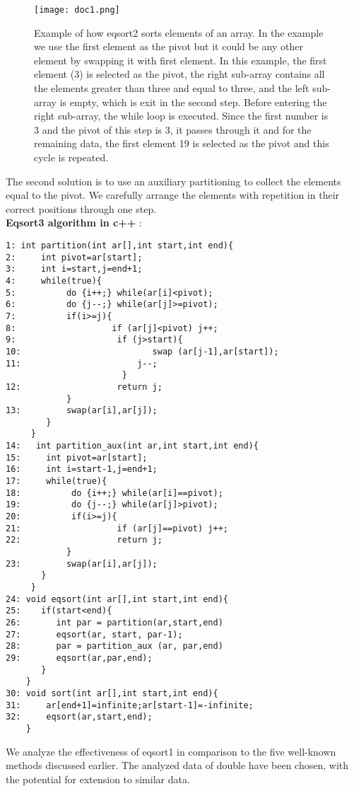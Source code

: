 \documentclass{article}
\begin{document}
 \begin{figure*}[h]
  \centering
  \texttt{[image: doc1.png]}
  \vspace*{-2mm}
  \caption{{{\footnotesize Example of how eqsort2 sorts elements of
  an array. In the example we use the first element as the
  pivot but it could be any other element by swapping it with first element.
  In this example, the first element (3) is selected as the pivot, the right sub-array contains all the elements greater than three and equal to three, and the left sub-array is empty, which is exit in the second step. Before entering the right sub-array, the while loop is executed. Since the first number is 3 and the pivot of this step is 3, it passes through it and for the remaining data, the first element 19 is selected as the pivot and this cycle is repeated.\\}}
}
  \label{fig:illu}
 \end{figure*}
 The second solution is to use an auxiliary partitioning to collect the elements equal to the pivot. We carefully arrange the elements with repetition in their correct positions through one step. \\

 \textbf{Eqsort3 algorithm in c++ }:

\begin{lstlisting}
1: int partition(int ar[],int start,int end){
2:     int pivot=ar[start];
3:     int i=start,j=end+1;
4:     while(true){
5:          do {i++;} while(ar[i]<pivot);
6:          do {j--;} while(ar[j]>=pivot);
7:          if(i>=j){
8:                   if (ar[j]<pivot) j++;
9:                    if (j>start){
10:                          swap (ar[j-1],ar[start]);
11:                       j--;
                       }
12:                   return j;
            }
13:         swap(ar[i],ar[j]);
        }
     }
14:   int partition_aux(int ar,int start,int end){
15:     int pivot=ar[start];
16:     int i=start-1,j=end+1;
17:     while(true){
18:          do {i++;} while(ar[i]==pivot);
19:          do {j--;} while(ar[j]>pivot);
20:          if(i>=j){
21:                   if (ar[j]==pivot) j++;
22:                   return j;
            }
23:         swap(ar[i],ar[j]);
       }
     }
24: void eqsort(int ar[],int start,int end){
25:    if(start<end){
26:       int par = partition(ar,start,end)
27:       eqsort(ar, start, par-1);
28:       par = partition_aux (ar, par,end)
29:       eqsort(ar,par,end);
       }
    }
30: void sort(int ar[],int start,int end){
31:     ar[end+1]=infinite;ar[start-1]=-infinite;
32:     eqsort(ar,start,end);
    }
\end{lstlisting}
We analyze the effectiveness of eqsort1  in comparison to the five well-known methods discussed earlier. The analyzed data of  double  have been chosen, with the potential for extension to similar data.
\end{document}
